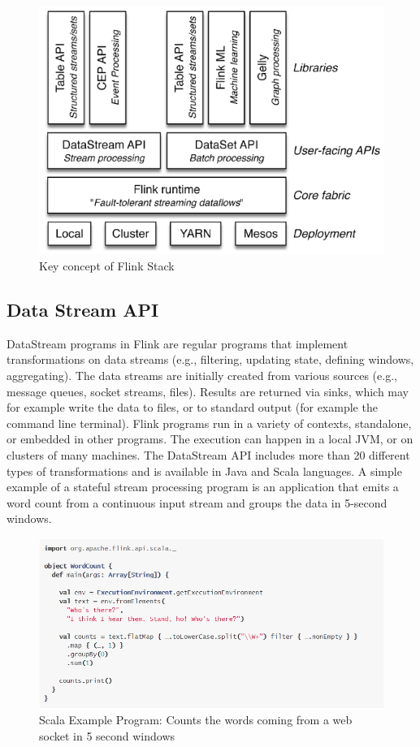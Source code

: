 \documentclass[9pt,twocolumn,twoside]{../../styles/osajnl}
\begin{document}
\begin{figure}[H]
 \centering
\includegraphics[scale=0.7]{images/image6}
\caption{Key concept of Flink Stack ~\cite{www-flink}}
\end{figure}

\subsection{Data Stream API}

DataStream programs in Flink are regular programs that implement transformations on data streams (e.g., filtering, updating state, defining windows, aggregating). The data streams are initially created from various sources (e.g., message queues, socket streams, files). Results are returned via sinks, which may for example write the data to files, or to standard output (for example the command line terminal). Flink programs run in a variety of contexts, standalone, or embedded in other programs. The execution can happen in a local JVM, or on clusters of many machines. The DataStream API includes more than 20 different types of transformations and is available in Java and Scala languages. A simple example of a stateful stream processing program is an application that emits a word count from a continuous input stream and groups the data in 5-second windows.

\begin{figure}[H]
 \centering
\includegraphics[scale=0.5]{images/image7}
\caption{Scala Example Program: Counts the words coming from a web socket in 5 second windows ~\cite{www-flink}}
\end{figure}
\end{document}
